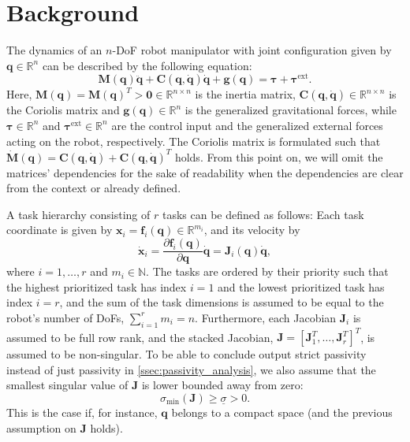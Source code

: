 \documentclass[../main.tex]{subfiles}
\begin{document}
\section{Background} \label{sec:background}
The dynamics of an $n$-DoF robot manipulator with joint configuration given by $\bm{q}\in \mathbb{R}^{n}$ can be described by the following equation:
\begin{equation} \label{eq:robot_dynamics}
    \bm{M}(\bm{q})\ddot{\bm{q}} + \bm{C}(\bm{q},\dot{\bm{q}})\dot{\bm{q}} + \bm{g}(\bm{q}) = \bm{\tau} + \bm{\tau}^\mathrm{ext}.
\end{equation}
Here, $\bm{M}(\bm{q}) = \bm{M}(\bm{q})^T > \bm{0} \in \mathbb{R}^{n\times n}$ is the inertia matrix, $\bm{C}(\bm{q},\dot{\bm{q}})\in \mathbb{R}^{n\times n}$ is the Coriolis matrix and $\bm{g}(\bm{q})\in \mathbb{R}^{n}$ is the generalized gravitational forces, while $\bm{\tau}\in \mathbb{R}^{n}$ and $\bm{\tau}^\mathrm{ext}\in \mathbb{R}^{n}$ are the control input and the generalized external forces acting on the robot, respectively. The Coriolis matrix is formulated such that $\dot{\bm{M}}(\bm{q}) = \bm{C}(\bm{q},\dot{\bm{q}}) + \bm{C}(\bm{q},\dot{\bm{q}})^T$ holds. 
From this point on, we will omit the matrices' dependencies for the sake of readability when the dependencies are clear from the context or already defined. 

A task hierarchy consisting of $r$ tasks can be defined as follows: Each task coordinate is given by $\bm{x}_i = \bm{f}_i(\bm{q}) \in \mathbb{R}^{m_i}$, and its velocity by
\begin{equation} \label{eq:xdot_qdot}
    \dot{\bm{x}}_i = \frac{\partial \bm{f}_i(\bm{q})}{\partial \bm{q}} \dot{\bm{q}}  =\bm{J}_i(\bm{q})\dot{\bm{q}},
\end{equation}
where $i=1,\dots, r$ and $m_i \in \mathbb{N}$. The tasks are ordered by their priority such that the highest prioritized task has index $i=1$ and the lowest prioritized task has index $i=r$, and the sum of the task dimensions is assumed to be equal to the robot's number of DoFs, $\sum_{i=1}^{r}m_i = n$.
Furthermore, each Jacobian $\bm{J}_i$ is assumed to be full row rank, and the stacked Jacobian, $\bm{J} = [\bm{J}_1^T, \dots, \bm{J}_r^T]^T$, is assumed to be non-singular.
To be able to conclude output strict passivity instead of just passivity in \cref{ssec:passivity_analysis}, we also assume that the smallest singular value of $\bm{J}$ is lower bounded away from zero:
\begin{equation} \label{eq:sing_val_bound}
    \sigma_\mathrm{min}(\bm{J}) \geq \underline{\sigma} > 0.
\end{equation}
This is the case if, for instance, 
$\bm{q}$ belongs to a compact space (and the previous assumption on $\bm{J}$ holds).
\end{document}
